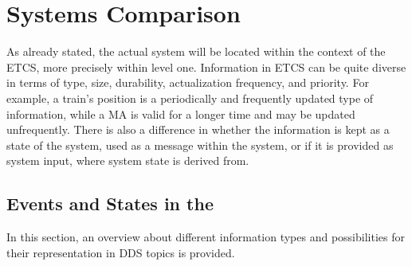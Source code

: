 \chapter{Systems Comparison}
\label{chptr:redundantSystemsCompare}

As already stated, the actual system will be located within the context of the \gls*{ETCS}, more precisely within  level one.
Information in \gls*{ETCS} can be quite diverse in terms of type, size, durability, actualization frequency, and priority.
For example, a train's position is a periodically and frequently updated type of information, while a \gls*{MA} is valid for a longer time and may be updated unfrequently.
There is also a difference in whether the information is kept as a state of the system, used as a message within the system, or if it is provided as system input, where system state is derived from.

\section{Events and States in the }
In this section, an overview about different information types and possibilities for their representation in \gls*{DDS} topics is provided.

